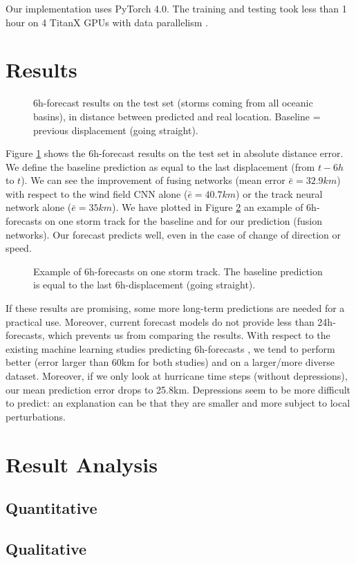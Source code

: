 Our implementation uses PyTorch 4.0.  The training and testing took less than 1 hour on 4 TitanX GPUs with data parallelism \cite{krizhevsky2014one}.


\section{Results}

\begin{figure}
	\begin{center}
		\hsize {}
	\end{center}
	\caption{6h-forecast results on the test set (storms coming from all oceanic basins), in distance between predicted and real location. Baseline = previous displacement (going straight).}
	\label{fig:boxplots}
\end{figure}

Figure \ref{fig:boxplots} shows the 6h-forecast results on the test set in absolute distance error. We define the baseline prediction as equal to the last displacement (from $t-6h$ to $t$). We can see the improvement of fusing networks (mean error $\bar{e}=32.9km$) with respect to the wind field CNN alone ($\bar{e}=40.7km$) or the track neural network alone ($\bar{e}=35km$).
We have plotted in Figure \ref{fig:track} an example of 6h-forecasts on one storm track for the baseline and for our prediction (fusion networks). Our forecast predicts well, even in the case of change of direction or speed.


\begin{figure}
	\begin{center}
		\hsize {}
	\end{center}
	\caption{Example of 6h-forecasts on one storm track. The baseline prediction is equal to the last 6h-displacement (going straight).}
	\label{fig:track}
\end{figure}


If these results are promising, some more long-term predictions are needed for a practical use. Moreover, current forecast models do not provide less than 24h-forecasts, which prevents us from comparing the results. With respect to the existing machine learning studies predicting 6h-forecasts \cite{liberge2011prevision,moradi2016sparse}, we tend to perform better (error larger than 60km for both studies) and on a larger/more diverse dataset. Moreover, if we only look at hurricane time steps (without depressions), our mean prediction error drops to 25.8km. Depressions seem to be more difficult to predict: an explanation can be that they are smaller and more subject to local perturbations.

\section{Result Analysis}
\subsection{Quantitative}

\subsection{Qualitative}


